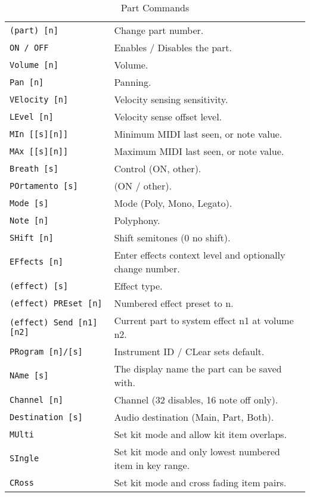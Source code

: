    \begin{table}[H]
      \centering
      \caption{Part Commands}
      \label{table:yoshimi_part_commands}
      \begin{tabular}{l l}
\texttt{(part) [n]} &
   Change part number.  \\
\texttt{ON / OFF} &
   Enables / Disables the part. \\
\texttt{Volume [n]} &
   Volume.  \\
\texttt{Pan [n]} &
   Panning.\\
\texttt{VElocity [n]} &
   Velocity sensing sensitivity. \\
\texttt{LEvel [n]} &
   Velocity sense offset level.  \\
\texttt{MIn [[s][n]]} &
   Minimum MIDI last seen, or note value.   \\
\texttt{MAx [[s][n]]} &
   Maximum MIDI last seen, or note value.   \\
\texttt{Breath [s]} &
   Control (ON, {other}).  \\
\texttt{POrtamento [s]} &
   (ON / other).   \\
\texttt{Mode [s]} &
   Mode (Poly, Mono, Legato). \\
\texttt{Note [n]} &
   Polyphony.  \\
\texttt{SHift [n]} &
   Shift semitones (0 no shift). \\
\texttt{EFfects [n]} &
   Enter effects context level and optionally change number.  \\
 \texttt{(effect) [s]} &
   Effect type.   \\
 \texttt{(effect) PREset [n]} &
   Numbered effect preset to n. \\
 \texttt{(effect) Send [n1] [n2]} &
   Current part to system effect n1 at volume n2. \\
\texttt{PRogram [n]/[s]} &
   Instrument ID / CLear sets default. \\
\texttt{NAme [s]} &
   The display name the part can be saved with. \\
\texttt{Channel [n]} &
   Channel (32 disables, 16 note off only).   \\
\texttt{Destination [s]} &
   Audio destination (Main, Part, Both).  \\
\texttt{MUlti} &
   Set kit mode and allow kit item overlaps. \\
\texttt{SIngle} &
   Set kit mode and only lowest numbered item in key range. \\
\texttt{CRoss} &
   Set kit mode and cross fading item pairs. \\

\end{tabular}
\end{table}
